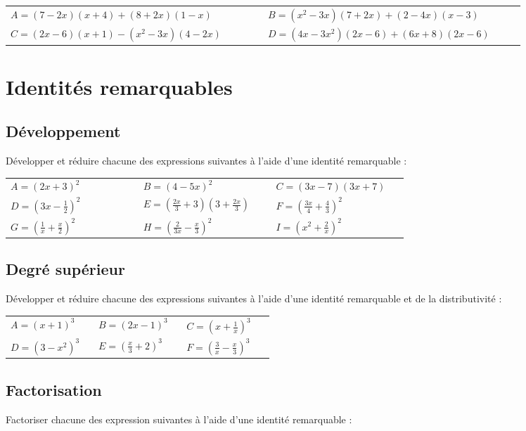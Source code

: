 \documentclass[oneside,12pt]{article}          %
\begin{document}
\begin{tabular}{p{0.45\linewidth} p{0.45\linewidth}}
	$A=(7-2x)(x+4)+(8+2x)(1-x)$ & $B=(x^2-3x)(7+2x)+(2-4x)(x-3)$ \\
	$C=(2x-6)(x+1)-(x^2-3x)(4-2x)$ & $D=(4x-3x^2)(2x-6)+(6x+8)(2x-6)$
\end{tabular}



\section{Identités remarquables}

\subsection{Développement}
Développer et réduire chacune des expressions suivantes à l'aide d'une identité remarquable :

\begin{tabular}{p{0.3\linewidth} p{0.3\linewidth} p{0.3\linewidth}}
	$A=(2x+3)^2$ & $B=(4-5x)^2$ & $C=(3x-7)(3x+7)$ \\
	$D=\left(3x-\frac{1}{2}\right)^2$ & $E=\left(\frac{2x}{3}+3\right)\left(3+\frac{2x}{3}\right)$ & $F=\left(\frac{3x}{4}+\frac{4}{3}\right)^2$ \\
	$G=\left(\frac{1}{x}+\frac{x}{2}\right)^2$ & $H=\left(\frac{2}{3x}-\frac{x}{3}\right)^2$ & $I=\left(x^2+\frac{2}{x}\right)^2$
\end{tabular}



\subsection{Degré supérieur}
Développer et réduire chacune des expressions suivantes à l'aide d'une identité remarquable et de la distributivité :

\begin{tabular}{p{0.3\linewidth} p{0.3\linewidth} p{0.3\linewidth}}
	$A=(x+1)^3$ & $B=(2x-1)^3$ & $C=\left(x+\frac{1}{x}\right)^3$ \\
	$D={(3-x^2)}^3$ & $E=\left(\frac{x}{3}+2\right)^3$ & $F=\left(\frac{3}{x}-\frac{x}{3}\right)^3$
\end{tabular}



\subsection{Factorisation}
Factoriser chacune des expression suivantes à l'aide d'une identité remarquable :
\end{document}
